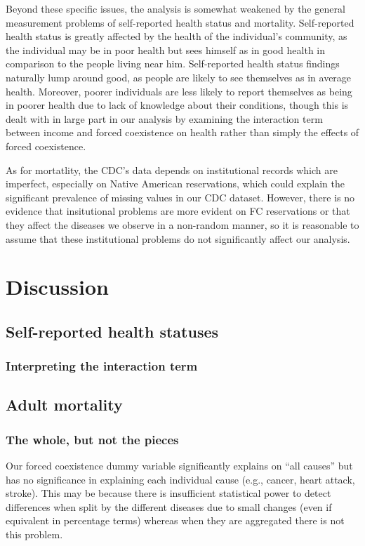 \documentclass[12pt]{article}
\begin{document}
Beyond these specific issues, the analysis is somewhat weakened by the general measurement problems of self-reported health status and mortality.  Self-reported health status is greatly affected by the health of the individual's community, as the individual may be in poor health but sees himself as in good health in comparison to the people living near him.  Self-reported health status findings naturally lump around good, as people are likely to see themselves as in average health.  Moreover, poorer individuals are less likely to report themselves as being in poorer health due to lack of knowledge about their conditions, though this is dealt with in large part in our analysis by examining the interaction term between income and forced coexistence on health rather than simply the effects of forced coexistence.  

As for mortatlity, the CDC's data depends on institutional records which are imperfect, especially on Native American reservations, which could explain the significant prevalence of missing values in our CDC dataset.  However, there is no evidence that insitutional problems are more evident on FC reservations or that they affect the diseases we observe in a non-random manner, so it is reasonable to assume that these institutional problems do not significantly affect our analysis.


\section{Discussion}
\subsection{Self-reported health statuses}
\subsubsection{Interpreting the interaction term}

\subsection{Adult mortality}
\subsubsection{The whole, but not the pieces}
Our forced coexistence dummy variable significantly explains on ``all causes'' but has no significance in explaining each individual cause (e.g., cancer, heart attack, stroke). 
This may be because there is insufficient statistical power to detect differences when split by the different diseases due to small changes (even if equivalent in percentage terms) whereas when they are aggregated there is not this problem. 
\end{document}

